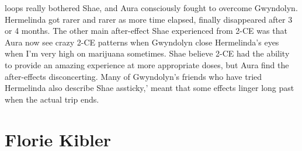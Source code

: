 \documentclass[12pt]{book}
\begin{document}
loops really bothered Shae, and Aura consciously fought to overcome Gwyndolyn. Hermelinda got rarer and rarer as more time elapsed, finally disappeared after 3 or 4 months. The other main after-effect Shae experienced from 2-CE was that Aura now see crazy 2-CE patterns when Gwyndolyn close Hermelinda's eyes when I'm very high on marijuana sometimes. Shae believe 2-CE had the ability to provide an amazing experience at more appropriate doses, but Aura find the after-effects disconcerting. Many of Gwyndolyn's friends who have tried Hermelinda also describe Shae assticky,' meant that some effects linger long past when the actual trip ends.



\chapter{Florie Kibler}
\end{document}
